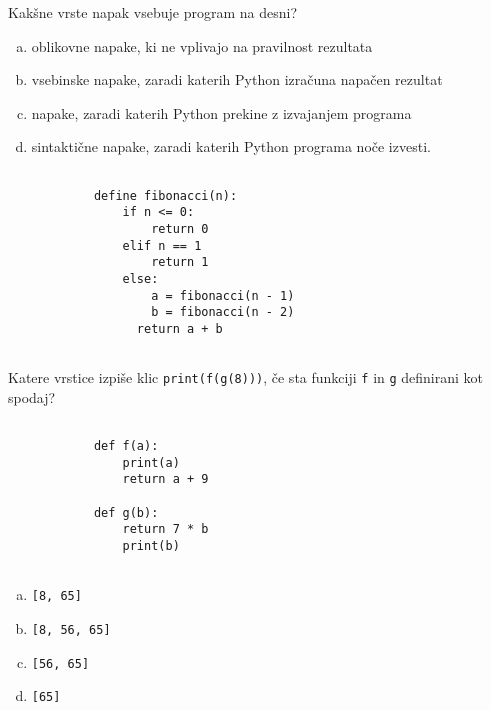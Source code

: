 \documentclass[arhiv, 10pt]{../izpit}
\newcommand{\inlinepy}[1]{\texttt{#1}}
\begin{document}
        \naloga*
        \begin{multicols}{2}
        \noindent
        Kakšne vrste napak vsebuje program na desni?

        \begin{enumerate}[(a)]
\item oblikovne napake, ki ne vplivajo na pravilnost rezultata
\item vsebinske napake, zaradi katerih Python izračuna napačen rezultat
\item napake, zaradi katerih Python prekine z izvajanjem programa
\item sintaktične napake, zaradi katerih Python programa noče izvesti.
\end{enumerate}

        \columnbreak

        \begin{verbatim}
        
            define fibonacci(n):
                if n <= 0:
                    return 0
                elif n == 1
                    return 1
                else:
                    a = fibonacci(n - 1)
                    b = fibonacci(n - 2)
                  return a + b
            
        \end{verbatim}

        \end{multicols}

    
        \naloga*
        Katere vrstice izpiše klic \inlinepy{print(f(g(8)))}, če sta funkciji \inlinepy{f} in \inlinepy{g} definirani kot spodaj?

        \begin{multicols}{2}
        \begin{verbatim}
        
            def f(a):
                print(a)
                return a + 9

            def g(b):
                return 7 * b
                print(b)
        
        \end{verbatim}

        \begin{enumerate}[(a)]
\item \inlinepy{[8, 65]}
\item \inlinepy{[8, 56, 65]}
\item \inlinepy{[56, 65]}
\item \inlinepy{[65]}
\end{enumerate}

        \end{multicols}
    
\end{document}
